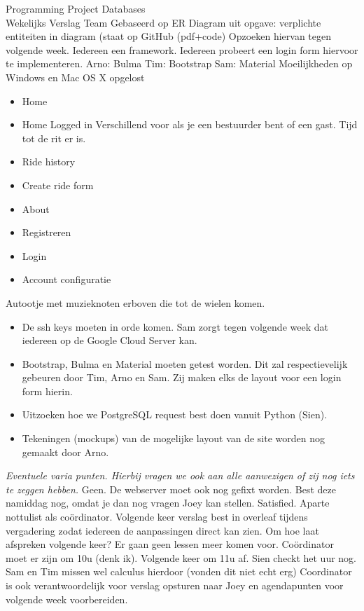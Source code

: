\documentclass{article}
\newcounter{team}
\begin{document}
\begin{Minutes}{Programming Project Databases \\ Wekelijks Verslag Team }
					Gebaseerd op ER Diagram uit opgave: verplichte entiteiten in diagram (staat op GitHub (pdf+code)
							Opzoeken hiervan tegen volgende week. Iedereen een framework. Iedereen probeert een login form hiervoor te implementeren.
							Arno: Bulma
							Tim: Bootstrap
							Sam: Material
					Moeilijkheden op Windows en Mac OS X opgelost
					\begin{itemize}
						\item Home
						\item Home Logged in
							Verschillend voor als je een bestuurder bent of een gast. Tijd tot de rit er is. 
						\item Ride history	
						\item Create ride form
						\item About
						\item Registreren
						\item Login 
						\item Account configuratie
					\end{itemize}
					Autootje met muzieknoten erboven die tot de wielen komen.
					
			\begin{itemize}
				\item De ssh keys moeten in orde komen. Sam zorgt tegen volgende week dat iedereen op de Google Cloud Server kan.
				\item Bootstrap, Bulma en Material moeten getest worden. Dit zal respectievelijk gebeuren door Tim, Arno en Sam. Zij maken elks de layout voor een login form hierin.
				\item Uitzoeken hoe we PostgreSQL request best doen vanuit Python (Sien).
				\item Tekeningen (mockups) van de mogelijke layout van de site worden nog gemaakt door Arno.
			\end{itemize}
		
		
			\emph{Eventuele varia punten. Hierbij vragen we ook aan alle aanwezigen of zij nog iets te zeggen hebben.}
					Geen.
					De webserver moet ook nog gefixt worden. Best deze namiddag nog, omdat je dan nog vragen Joey kan stellen. 
					Satisfied.
					Aparte nottulist als co\"ordinator. Volgende keer verslag best in overleaf tijdens vergadering zodat iedereen de aanpassingen direct kan zien.
					Om hoe laat afspreken volgende keer? Er gaan geen lessen meer komen voor. Co\"ordinator moet er zijn om 10u (denk ik). Volgende keer om 11u af. Sien checkt het uur nog. Sam en Tim missen wel calculus hierdoor (vonden dit niet echt erg)
					Coordinator is ook verantwoordelijk voor verslag opsturen naar Joey en agendapunten voor volgende week voorbereiden.
			

\end{Minutes}
\end{document}
